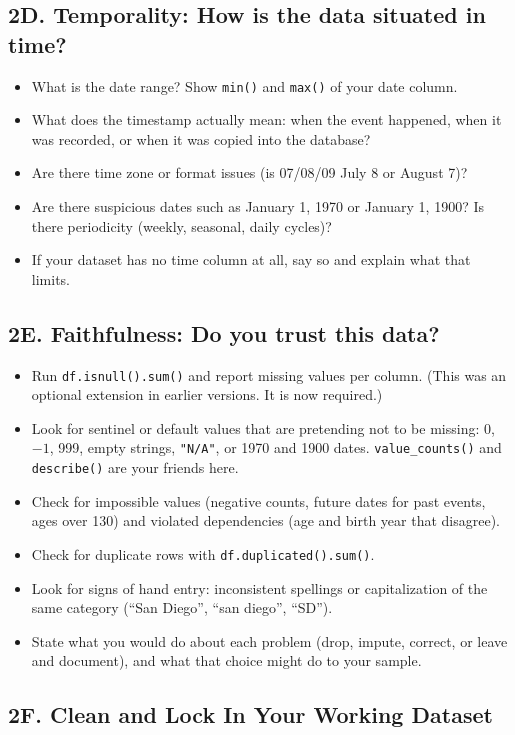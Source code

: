 \documentclass[11pt,letterpaper]{article}
\newcommand{\code}[1]{\texttt{#1}}
\begin{document}
\subsection{2D. Temporality: How is the data situated in time?}
\begin{itemize}
  \item What is the date range? Show \code{min()} and \code{max()} of your date column.
  \item What does the timestamp actually mean: when the event happened, when it was recorded, or when it was copied into the database?
  \item Are there time zone or format issues (is 07/08/09 July 8 or August 7)?
  \item Are there suspicious dates such as January 1, 1970 or January 1, 1900? Is there periodicity (weekly, seasonal, daily cycles)?
  \item If your dataset has no time column at all, say so and explain what that limits.
\end{itemize}

\subsection{2E. Faithfulness: Do you trust this data?}
\begin{itemize}
  \item Run \code{df.isnull().sum()} and report missing values per column. (This was an optional extension in earlier versions. It is now required.)
  \item Look for sentinel or default values that are pretending not to be missing: 0, $-1$, 999, empty strings, \code{"N/A"}, or 1970 and 1900 dates. \code{value\_counts()} and \code{describe()} are your friends here.
  \item Check for impossible values (negative counts, future dates for past events, ages over 130) and violated dependencies (age and birth year that disagree).
  \item Check for duplicate rows with \code{df.duplicated().sum()}.
  \item Look for signs of hand entry: inconsistent spellings or capitalization of the same category (``San Diego'', ``san diego'', ``SD'').
  \item State what you would do about each problem (drop, impute, correct, or leave and document), and what that choice might do to your sample.
\end{itemize}

\subsection{2F. Clean and Lock In Your Working Dataset}
\end{document}

